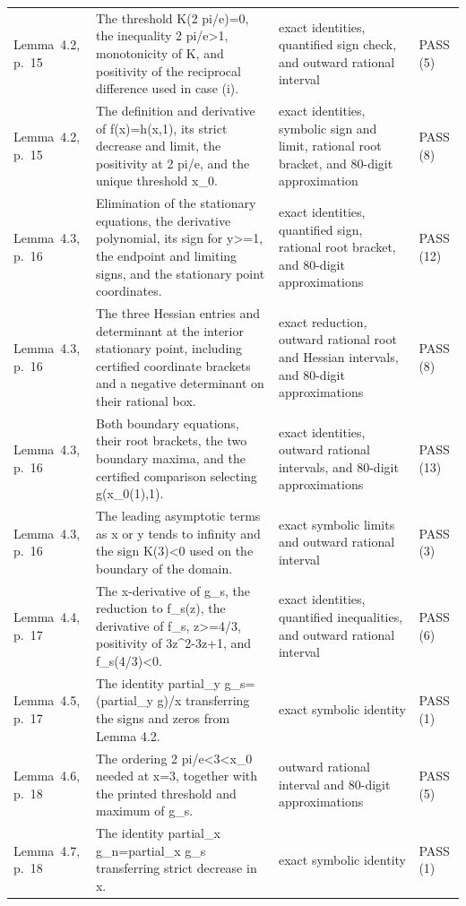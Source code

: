 {\begin{longtable}{@{}>{\raggedright\arraybackslash}p{30mm}>{\raggedright\arraybackslash}p{64mm}>{\raggedright\arraybackslash}p{44mm}>{\raggedright\arraybackslash}p{16mm}@{}}
Lemma~4.2, p.~15 & The threshold K(2 pi/e)=0, the inequality 2 pi/e>1, monotonicity of K, and positivity of the reciprocal difference used in case (i). & exact identities, quantified sign check, and outward rational interval & PASS (5) \\
Lemma~4.2, p.~15 & The definition and derivative of f(x)=h(x,1), its strict decrease and limit, the positivity at 2 pi/e, and the unique threshold x\_0. & exact identities, symbolic sign and limit, rational root bracket, and 80-digit approximation & PASS (8) \\
Lemma~4.3, p.~16 & Elimination of the stationary equations, the derivative polynomial, its sign for y>=1, the endpoint and limiting signs, and the stationary point coordinates. & exact identities, quantified sign, rational root bracket, and 80-digit approximations & PASS (12) \\
Lemma~4.3, p.~16 & The three Hessian entries and determinant at the interior stationary point, including certified coordinate brackets and a negative determinant on their rational box. & exact reduction, outward rational root and Hessian intervals, and 80-digit approximations & PASS (8) \\
Lemma~4.3, p.~16 & Both boundary equations, their root brackets, the two boundary maxima, and the certified comparison selecting g(x\_0(1),1). & exact identities, outward rational intervals, and 80-digit approximations & PASS (13) \\
Lemma~4.3, p.~16 & The leading asymptotic terms as x or y tends to infinity and the sign K(3)<0 used on the boundary of the domain. & exact symbolic limits and outward rational interval & PASS (3) \\
Lemma~4.4, p.~17 & The x-derivative of g\_s, the reduction to f\_s(z), the derivative of f\_s, z>=4/3, positivity of 3z\textasciicircum{}2-3z+1, and f\_s(4/3)<0. & exact identities, quantified inequalities, and outward rational interval & PASS (6) \\
Lemma~4.5, p.~17 & The identity partial\_y g\_s=(partial\_y g)/x transferring the signs and zeros from Lemma 4.2. & exact symbolic identity & PASS (1) \\
Lemma~4.6, p.~18 & The ordering 2 pi/e<3<x\_0 needed at x=3, together with the printed threshold and maximum of g\_s. & outward rational interval and 80-digit approximations & PASS (5) \\
Lemma~4.7, p.~18 & The identity partial\_x g\_n=partial\_x g\_s transferring strict decrease in x. & exact symbolic identity & PASS (1) \\

\end{longtable}}
